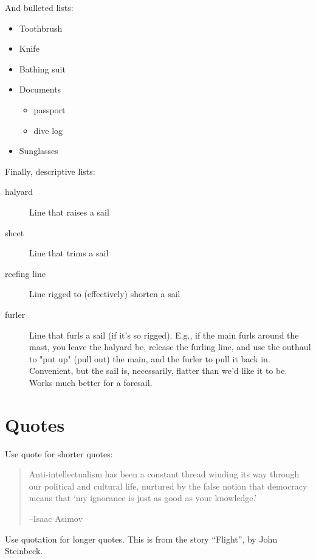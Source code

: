 \documentclass[a4paper,12pt,titlepage]{article}
\begin{document}
\noindent And bulleted lists:

\begin{itemize}
	\item Toothbrush
	\item Knife
	\item Bathing suit
	\item
		Documents
		\begin{itemize}
			\item passport
			\item dive log
		\end{itemize}
	\item Sunglasses
\end{itemize}

\noindent Finally, descriptive lists:

\begin{description}
	\item[halyard]
		Line that raises a sail
	\item[sheet]
		Line that trims a sail
	\item[reefing line]
		Line rigged to (effectively) shorten a sail
	\item[furler]
		Line that furls a sail (if it's so rigged).  E.g., if the main furls
		around the mast, you leave the halyard be, release the furling line, and
		use the outhaul to "put up" (pull out) the main, and the furler to pull
		it back in.  Convenient, but the sail is, necessarily, flatter than we'd
		like it to be.  Works much better for a foresail.
\end{description}

\section*{Quotes}

Use quote for shorter quotes:

\begin{quote}
Anti-intellectualism has been a constant thread winding its way through our
political and cultural life, nurtured by the false notion that democracy
means that `my ignorance is just as good as your knowledge.'

--Isaac Asimov
\end{quote}

Use quotation for longer quotes.  This is from the story ``Flight'', by John
Steinbeck.
\end{document}
